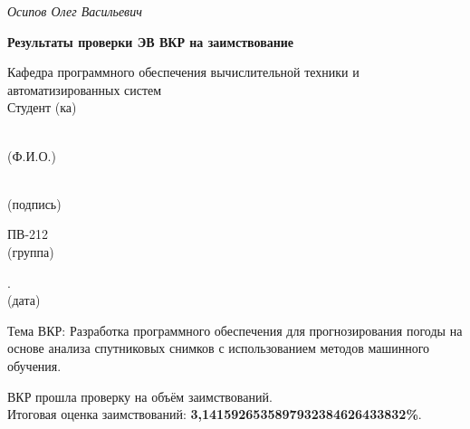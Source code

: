 \documentclass[14pt]{extarticle}
\begin{document}
\vspace{2em}

{\small
	\noindent{} \textit{Осипов Олег Васильевич}}\\[-0.5em]
\noindent
\hspace*{5cm}{\footnotesize (подпись)}
\hspace{5cm}{\footnotesize (Ф.И.О.)}


\newpage
\advance\hoffset 1.5cm %
\begin{center}
	\textbf{Результаты проверки ЭВ ВКР на заимствование}
\end{center}

\vspace{1em}

\noindent Кафедра программного обеспечения вычислительной техники и автоматизированных систем\\[0.5em]

\noindent
Студент (ка)\,\makebox[0cm][l]{\underline{\hspace{13.4cm}}}%
\parbox[t]{3.5cm}{\centering {}\\[-0.2em] \footnotesize (Ф.И.О.)\par}%
\parbox[t]{4.5cm}{\centering \,\\[-0.2em] \footnotesize (подпись)\par}%
\parbox[t]{2.2cm}{\centering ПВ-212\\[-0.2em] \footnotesize (группа)\par}%
\parbox[t]{2.5cm}{.\the\year\\[-0.2em] \footnotesize (дата)\par}%


\vspace{1em}

\noindent
Тема ВКР: Разработка программного обеспечения для прогнозирования погоды на основе анализа спутниковых снимков с использованием методов машинного обучения.

\vspace{1em}

\noindent
ВКР прошла проверку на объём заимствований.\\
Итоговая оценка заимствований: \textbf{3,1415926535897932384626433832\%}.
\end{document}
